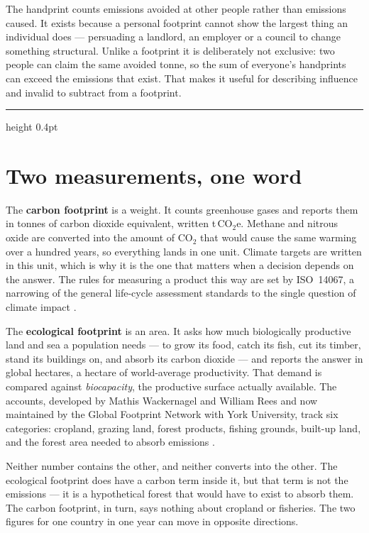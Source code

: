 \documentclass[11pt,a4paper]{article}
\begin{document}
The handprint counts emissions avoided at other people rather than emissions
caused. It exists because a personal footprint cannot show the largest thing an
individual does — persuading a landlord, an employer or a council to change
something structural. Unlike a footprint it is deliberately not exclusive: two
people can claim the same avoided tonne, so the sum of everyone's handprints can
exceed the emissions that exist. That makes it useful for describing influence and
invalid to subtract from a footprint.

\vspace{4pt}
\hrule height 0.4pt

\section{Two measurements, one word}

The \textbf{carbon footprint} is a weight. It counts greenhouse gases and reports
them in tonnes of carbon dioxide equivalent, written t\,CO$_2$e. Methane and
nitrous oxide are converted into the amount of CO$_2$ that would cause the same
warming over a hundred years, so everything lands in one unit. Climate targets are
written in this unit, which is why it is the one that matters when a decision
depends on the answer. The rules for measuring a product this way are set by
ISO~14067, a narrowing of the general life-cycle assessment standards to the single
question of climate impact \cite{iso14067,iso14040,iso14044}.

The \textbf{ecological footprint} is an area. It asks how much biologically
productive land and sea a population needs — to grow its food, catch its fish, cut
its timber, stand its buildings on, and absorb its carbon dioxide — and reports the
answer in global hectares, a hectare of world-average productivity. That demand is
compared against \emph{biocapacity}, the productive surface actually available. The
accounts, developed by Mathis Wackernagel and William Rees and now maintained by
the Global Footprint Network with York University, track six categories: cropland,
grazing land, forest products, fishing grounds, built-up land, and the forest area
needed to absorb emissions \cite{gfn-data}.

Neither number contains the other, and neither converts into the other. The
ecological footprint does have a carbon term inside it, but that term is not the
emissions — it is a hypothetical forest that would have to exist to absorb them.
The carbon footprint, in turn, says nothing about cropland or fisheries. The two
figures for one country in one year can move in opposite directions.
\end{document}
